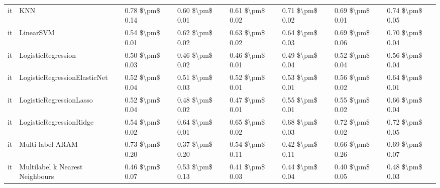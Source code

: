 \begin{tabular}{llllllll}
      it &                             KNN &     0.78 \$\textbackslash pm\$ 0.14 &           0.60 \$\textbackslash pm\$ 0.01 &       0.61 \$\textbackslash pm\$ 0.02 &        0.71 \$\textbackslash pm\$ 0.02 &                         0.69 \$\textbackslash pm\$ 0.01 &     0.74 \$\textbackslash pm\$ 0.05 \\
      it &                       LinearSVM &     0.54 \$\textbackslash pm\$ 0.01 &           0.62 \$\textbackslash pm\$ 0.02 &       0.63 \$\textbackslash pm\$ 0.02 &        0.64 \$\textbackslash pm\$ 0.03 &                         0.69 \$\textbackslash pm\$ 0.06 &     0.70 \$\textbackslash pm\$ 0.04 \\
      it &              LogisticRegression &     0.50 \$\textbackslash pm\$ 0.03 &           0.46 \$\textbackslash pm\$ 0.02 &       0.46 \$\textbackslash pm\$ 0.01 &        0.49 \$\textbackslash pm\$ 0.04 &                         0.52 \$\textbackslash pm\$ 0.04 &     0.56 \$\textbackslash pm\$ 0.04 \\
      it &    LogisticRegressionElasticNet &     0.52 \$\textbackslash pm\$ 0.04 &           0.51 \$\textbackslash pm\$ 0.03 &       0.52 \$\textbackslash pm\$ 0.01 &        0.53 \$\textbackslash pm\$ 0.01 &                         0.56 \$\textbackslash pm\$ 0.02 &     0.64 \$\textbackslash pm\$ 0.01 \\
      it &         LogisticRegressionLasso &     0.52 \$\textbackslash pm\$ 0.04 &           0.48 \$\textbackslash pm\$ 0.02 &       0.47 \$\textbackslash pm\$ 0.01 &        0.55 \$\textbackslash pm\$ 0.01 &                         0.55 \$\textbackslash pm\$ 0.02 &     0.66 \$\textbackslash pm\$ 0.04 \\
      it &         LogisticRegressionRidge &     0.54 \$\textbackslash pm\$ 0.02 &           0.64 \$\textbackslash pm\$ 0.01 &       0.65 \$\textbackslash pm\$ 0.02 &        0.68 \$\textbackslash pm\$ 0.03 &                         0.72 \$\textbackslash pm\$ 0.02 &     0.72 \$\textbackslash pm\$ 0.05 \\
      it &                Multi-label ARAM &     0.73 \$\textbackslash pm\$ 0.20 &           0.37 \$\textbackslash pm\$ 0.20 &       0.54 \$\textbackslash pm\$ 0.11 &        0.42 \$\textbackslash pm\$ 0.11 &                         0.66 \$\textbackslash pm\$ 0.26 &     0.69 \$\textbackslash pm\$ 0.07 \\
      it & Multilabel k Nearest Neighbours &     0.46 \$\textbackslash pm\$ 0.07 &           0.53 \$\textbackslash pm\$ 0.13 &       0.41 \$\textbackslash pm\$ 0.03 &        0.44 \$\textbackslash pm\$ 0.04 &                         0.40 \$\textbackslash pm\$ 0.05 &     0.48 \$\textbackslash pm\$ 0.03 \\

\end{tabular}
